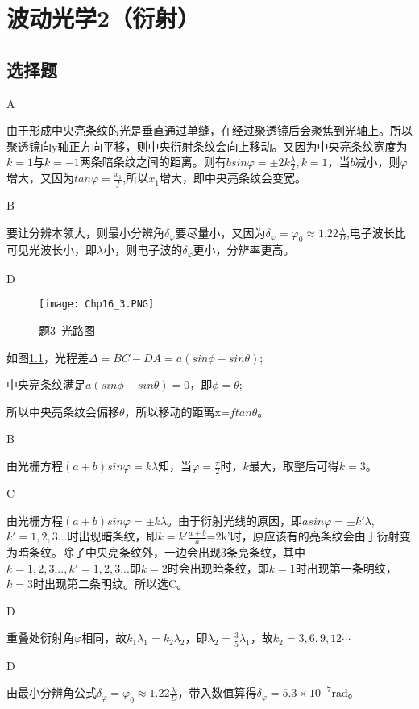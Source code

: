 \chapter{波动光学2（衍射）}
\section{选择题}
\exercise A

\solve
由于形成中央亮条纹的光是垂直通过单缝，在经过聚透镜后会聚焦到光轴上。所以聚透镜向y轴正方向平移，则中央衍射条纹会向上移动。又因为中央亮条纹宽度为$k=1$与$k=-1$两条暗条纹之间的距离。则有$bsin\varphi=\pm2k\frac{\lambda}{2},k=1$，当$b$减小，则$\varphi$增大，又因为$tan\varphi=\frac{x_1}{f}$,所以$x_1$增大，即中央亮条纹会变宽。

\exercise B

\solve
要让分辨本领大，则最小分辨角$\delta_\varphi$要尽量小，又因为$\delta_\varphi=\varphi_0\approx1.22\frac{\lambda}{D}$,电子波长比可见光波长小，即$\lambda$小，则电子波的$\delta_\varphi$更小，分辨率更高。

\exercise D

\solve
\begin{figure}[htbp]
\centering
\texttt{[image: Chp16\_3.PNG]}
\caption{题3\ 光路图}\label{fig:16_3}
\end{figure}
如图\ref{fig:16_3}，光程差$\Delta=BC-DA=a(sin\phi-sin\theta)$;

中央亮条纹满足$a(sin\phi-sin\theta)=0$，即$\phi=\theta$;

所以中央亮条纹会偏移$\theta$，所以移动的距离x=$ftan\theta$。

\exercise B

\solve
由光栅方程$(a+b)sin\varphi=k\lambda$知，当$\varphi=\frac{\pi}{2}$时，$k$最大，取整后可得$k=3$。

\exercise C

\solve
由光栅方程$(a+b)sin\varphi=\pm k\lambda$。由于衍射光线的原因，即$asin\varphi=\pm k'\lambda$,$k'=1,2,3...$时出现暗条纹，即$k=k'\frac{a+b}{a}$=2k'时，原应该有的亮条纹会由于衍射变为暗条纹。除了中央亮条纹外，一边会出现3条亮条纹，其中$k=1,2,3...,k'=1,2,3...$即$k=2$时会出现暗条纹，即$k=1$时出现第一条明纹，$k=3$时出现第二条明纹。所以选C。

\exercise D

\solve
重叠处衍射角$\varphi$相同，故$k_1\lambda_1=k_2\lambda_2$，即$\lambda_2=\frac{3}{5}\lambda_1$，故$k_2=3,6,9,12\cdots$

\exercise D

\solve
由最小分辨角公式$\delta_\varphi=\varphi_0\approx1.22\frac{\lambda}{D}$，带入数值算得$\delta_\varphi=5.3\times10^{-7}\mathrm{rad}$。

